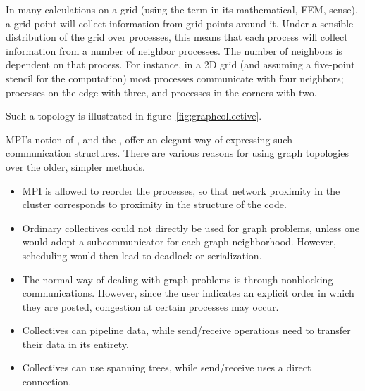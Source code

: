 In many calculations on a grid (using the term in its mathematical,
\ac{FEM}, sense), a grid point will collect information from grid
points around it. Under a sensible distribution of the grid over
processes, this means that each process will collect information from
a number of neighbor processes. The number of 
neighbors is dependent on that process. For instance, in a 2D
grid (and assuming a five-point stencil for the computation) most
processes communicate with four neighbors; processes on the edge with
three, and processes in the corners with two.

Such a topology is illustrated in figure~\ref{fig:graphcollective}.

MPI's notion of , and the
, offer an elegant way of
expressing such communication structures. There are various reasons
for using graph topologies over the older, simpler methods.
\begin{itemize}
\item MPI is allowed to reorder the processes, so that network proximity
  in the cluster corresponds to proximity in the structure of the
  code.
\item Ordinary collectives could not directly be used for graph
  problems, unless one would adopt a subcommunicator for each graph
  neighborhood. However, scheduling would then lead to deadlock or
  serialization.
\item The normal way of dealing with graph problems is through
  nonblocking communications. However, since the user indicates an
  explicit order in which they are posted, congestion at certain
  processes may occur.
\item Collectives can pipeline data, while send/receive operations
  need to transfer their data in its entirety.
\item Collectives can use spanning trees, while send/receive uses a
  direct connection.
\end{itemize}

